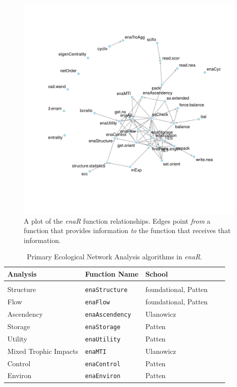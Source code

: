 \documentclass[article]{jss}
\begin{document}
\begin{figure}
  \center
  \includegraphics{images/enaR-vignette-003.pdf}
  \caption{A plot of the \textit{enaR} function relationships. Edges
    point \textit{from} a function that provides information \textit{to}
    the function that receives that information.} \label{fig:depnet}
\end{figure}

\begin{table}
\center
\caption{Primary Ecological Network Analysis algorithms in
  \textit{enaR}.} \label{tab:alg}
\tableline
\begin{tabular}{l l l l l }
\textbf{Analysis} & \textbf{Function Name} & \textbf{School} \\ \hline \\ [-1ex]
Structure & \texttt{enaStructure} & foundational, Patten \\
Flow & \texttt{enaFlow} & foundational, Patten \\
Ascendency & \texttt{enaAscendency} & Ulanowicz \\
Storage & \texttt{enaStorage} & Patten \\
Utility & \texttt{enaUtility} & Patten \\
Mixed Trophic Impacts & \texttt{enaMTI} & Ulanowicz \\
Control & \texttt{enaControl} & Patten \\
Environ & \texttt{enaEnviron} & Patten \\
\end{tabular}
\tableline
\end{table}
\end{document}
